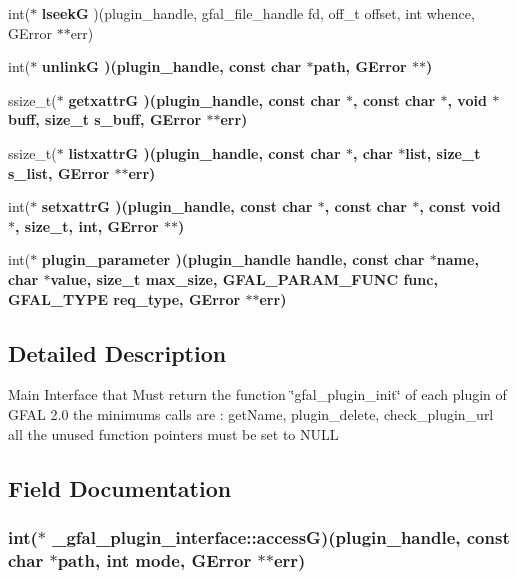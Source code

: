 \begin{CompactItemize}
\item 
int($\ast$ \textbf{lseek\-G} )(plugin\_\-handle, gfal\_\-file\_\-handle fd, off\_\-t offset, int whence, GError $\ast$$\ast$err)\label{struct__gfal__plugin__interface_424d4d77e29e5e4cfe92eae0d6a8bdc2}

\item 
int($\ast$ \bf{unlink\-G} )(plugin\_\-handle, const char $\ast$path, GError $\ast$$\ast$)
\item 
ssize\_\-t($\ast$ \bf{getxattr\-G} )(plugin\_\-handle, const char $\ast$, const char $\ast$, void $\ast$buff, size\_\-t s\_\-buff, GError $\ast$$\ast$err)
\item 
ssize\_\-t($\ast$ \bf{listxattr\-G} )(plugin\_\-handle, const char $\ast$, char $\ast$list, size\_\-t s\_\-list, GError $\ast$$\ast$err)
\item 
int($\ast$ \bf{setxattr\-G} )(plugin\_\-handle, const char $\ast$, const char $\ast$, const void $\ast$, size\_\-t, int, GError $\ast$$\ast$)
\item 
int($\ast$ \bf{plugin\_\-parameter} )(plugin\_\-handle handle, const char $\ast$name, char $\ast$value, size\_\-t max\_\-size, GFAL\_\-PARAM\_\-FUNC func, GFAL\_\-TYPE req\_\-type, GError $\ast$$\ast$err)
\end{CompactItemize}


\subsection{Detailed Description}
Main Interface that Must return the function \char`\"{}gfal\_\-plugin\_\-init\char`\"{} of each plugin of GFAL 2.0 the minimums calls are : get\-Name, plugin\_\-delete, check\_\-plugin\_\-url all the unused function pointers must be set to NULL 



\subsection{Field Documentation}
\subsubsection{\setlength{\rightskip}{0pt plus 5cm}int($\ast$ \bf{\_\-gfal\_\-plugin\_\-interface::access\-G})(plugin\_\-handle, const char $\ast$path, int mode, GError $\ast$$\ast$err)}\label{struct__gfal__plugin__interface_1fa81d7a219629281c14b05116d32202}


